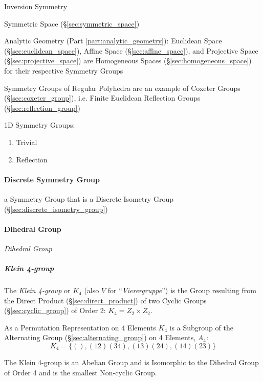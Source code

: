 Inversion Symmetry %

\fist Symmetric Space (\S\ref{sec:symmetric_space})

Analytic Geometry (Part \ref{part:analytic_geometry}): Euclidean Space
(\S\ref{sec:euclidean_space}), Affine Space (\S\ref{sec:affine_space}), and
Projective Space (\S\ref{sec:projective_space}) are Homogeneous Spaces
(\S\ref{sec:homogeneous_space}) for their respective Symmetry Groups

Symmetry Groups of Regular Polyhedra are an example of Coxeter Groups
(\S\ref{sec:coxeter_group}), i.e. Finite Euclidean Reflection Groups
(\S\ref{sec:reflection_group})

1D Symmetry Groups: %
\begin{enumerate}
  \item Trivial
  \item Reflection
\end{enumerate}



\paragraph{Discrete Symmetry Group}\label{sec:discrete_symmetry_group}\hfill

a Symmetry Group that is a Discrete Isometry Group
(\S\ref{sec:discrete_isometry_group})



\paragraph{Dihedral Group}\label{sec:dihedral_group}\hfill

\emph{Dihedral Group}


\subparagraph{Klein 4-group}\label{sec:klein_4group}\hfill

The \emph{Klein 4-group} or $K_4$ (also $V$ for
``\emph{Vierergruppe}'') is the Group resulting from the Direct
Product (\S\ref{sec:direct_product}) of two Cyclic Groups
(\S\ref{sec:cyclic_group}) of Order 2: $K_4 = Z_2 \times Z_2$.

As a Permutation Representation on 4 Elements $K_4$ is a Subgroup of
the Alternating Group (\S\ref{sec:alternating_group}) on 4 Elements,
$A_4$:
\[
    K_4 = \{ (), (12)(34), (13)(24), (14)(23) \}
\]

The Klein 4-group is an Abelian Group and is Isomorphic to the
Dihedral Group of Order 4 and is the smallest Non-cyclic Group.

